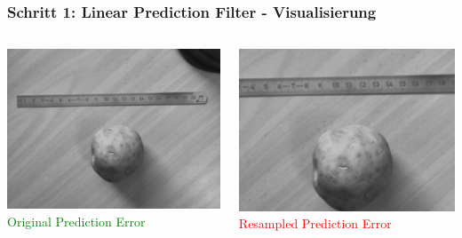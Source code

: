 \documentclass[11pt,t,usepdftitle=false,aspectratio=169]{beamer}
\begin{document}
\begin{frame}
	\frametitle{Schritt 1: Linear Prediction Filter - Visualisierung}
	\begin{columns}[T]
		\begin{column}{0.48\textwidth}
			\includegraphics[width=\textwidth]{images/examples_unedited/predicted.png}
			\textcolor{green}{\small Original Prediction Error}
		\end{column}
		\begin{column}{0.48\textwidth}
			\includegraphics[width=\textwidth]{images/examples_edited/predicted.png}
			\textcolor{red}{\small Resampled Prediction Error}
		\end{column}
	\end{columns}
\end{frame}
\end{document}
